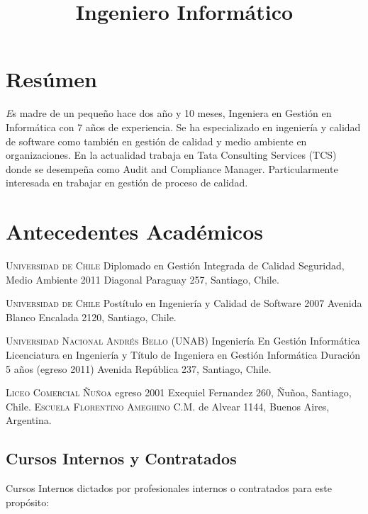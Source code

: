\documentclass[11pt,letterpaper,roman]{moderncv}
\title{\normalfont \small Ingeniero Informático}
\begin{document}
\maketitle

\section*{\textbf{Res\'umen}}
	\begin{scriptsize}
	\textsl
	Es madre de un peque\~no hace dos a\~no y 10 meses, Ingeniera en Gestión en Informática con 7 años de experiencia.  %
	Se ha especializado en ingeniería y calidad de software como también en gestión de calidad y medio ambiente en organizaciones. %
    En la actualidad trabaja en Tata Consulting Services (TCS) donde se desempeña como Audit and Compliance Manager. %
   	Particularmente interesada en trabajar en gestión de proceso de calidad. %
    \end{scriptsize}
    \newline

\section{Antecedentes Acad\'emicos}


	{\textsc{Universidad de Chile}}
	{Diplomado en Gestión Integrada de Calidad Seguridad, Medio Ambiente}
	{2011}
	{}
	{Diagonal Paraguay 257, Santiago, Chile.}
	
	{\textsc{Universidad de Chile}}
	{Postítulo en Ingeniería y Calidad de Software}
	{2007}
	{}
	{Avenida Blanco Encalada 2120, Santiago, Chile.}
	
	{\textsc{Universidad Nacional Andrés Bello (UNAB)}}
	{Ingenier\'ia En Gestión Inform\'atica}
	{Licenciatura en Ingeniería y Título de Ingeniera en Gestión Informática	}
	{Duración 5 años (egreso 2011)}
	{Avenida República 237, Santiago, Chile.}


	{\textsc{Liceo Comercial Ñuñoa}}
	{egreso 2001}
	{}
	{}
	{Exequiel Fernandez 260, Ñuñoa, Santiago, Chile.}
	{\textsc{Escuela Florentino Ameghino}}
	{}
	{}
	{}
	{C.M. de Alvear 1144, Buenos Aires, Argentina.}

\subsection{Cursos Internos y Contratados}
Cursos Internos dictados por profesionales internos o contratados para este propósito:
\end{document}
